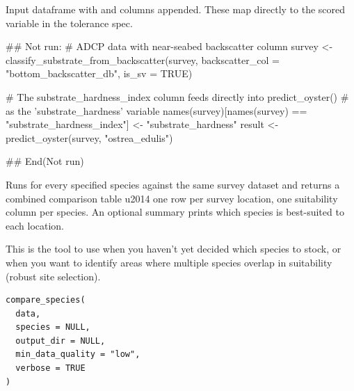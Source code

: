 \documentclass[a4paper]{book}
\begin{document}
%
\begin{Value}
Input dataframe with  and
 columns appended. These map directly to the
 scored variable in the tolerance spec.
\end{Value}
%
\begin{Examples}
\begin{ExampleCode}
## Not run: 
# ADCP data with near-seabed backscatter column
survey <- classify_substrate_from_backscatter(survey,
            backscatter_col = "bottom_backscatter_db",
            is_sv = TRUE)

# The substrate_hardness_index column feeds directly into predict_oyster()
# as the 'substrate_hardness' variable
names(survey)[names(survey) == "substrate_hardness_index"] <- "substrate_hardness"
result <- predict_oyster(survey, "ostrea_edulis")

## End(Not run)
\end{ExampleCode}
\end{Examples}
%
\begin{Description}
Runs  for every specified species against the same survey
dataset and returns a combined comparison table \bsl{}u2014 one row per survey
location, one suitability column per species. An optional summary prints
which species is best-suited to each location.

This is the tool to use when you haven't yet decided which species to stock,
or when you want to identify areas where multiple species overlap in
suitability (robust site selection).
\end{Description}
%
\begin{Usage}
\begin{verbatim}
compare_species(
  data,
  species = NULL,
  output_dir = NULL,
  min_data_quality = "low",
  verbose = TRUE
)
\end{verbatim}
\end{Usage}
%
\end{document}
